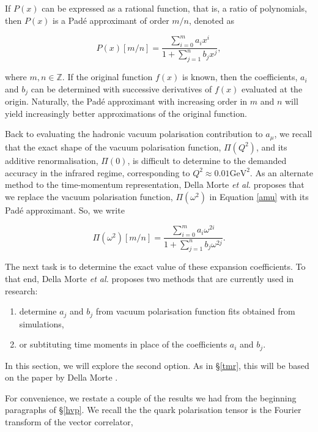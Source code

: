 \documentclass{article}
\numberwithin{equation}{section} %
\begin{document}
If $P(x)$ can be expressed as a rational function, that is, a ratio of polynomials, then $P(x)$ is a Pad\'{e} approximant of order $m/n$\cite{pade}, denoted as 

\begin{equation}
P(x)[m/n] = \frac{\sum_{i=0}^ma_ix^i}{1+\sum_{j=1}^nb_jx^j},
\label{pade}
\end{equation}

\noindent where $m,n\in \mathbb{Z}$. If the original function $f(x)$ is known, then the coefficients, $a_i$ and $b_j$ can be determined with successive derivatives of $f(x)$ evaluated at the origin. Naturally, the Pad\'{e} approximant with increasing order in $m$ and $n$ will yield increasingly better approximations of the original function.

Back to evaluating the hadronic vacuum polarisation contribution to $a_\mu$, we recall that the exact shape of the vacuum polarisation function, $\Pi(Q^2)$, and its additive renormalisation, $\Pi(0)$, is difficult to determine to the demanded accuracy in the infrared regime, corresponding to $Q^2 \approx 0.01\mathrm{GeV}^2$\cite{dellamorte}. As an alternate method to the time-momentum representation, Della Morte \textit{et al.}\cite{dellamorte} proposes that we replace the vacuum polarisation function, $\Pi(\omega^2)$ in Equation \ref{amu} with its Pad\'{e} approximant. So, we write

\begin{equation}
\Pi(\omega^2)[m/n] = \frac{\sum_{i=0}^ma_i\omega^{2i}}{1+\sum_{j=1}^nb_j\omega^{2j}}.
\end{equation}

The next task is to determine the exact value of these expansion coefficients. To that end, Della Morte \textit{et al.} proposes two methods that are currently used in research:

\begin{enumerate}
\item determine $a_j$ and $b_j$ from vacuum polarisation function fits obtained from simulations,
\item or subtituting time moments in place of the coefficients $a_i$ and $b_j$.
\end{enumerate}

In this section, we will explore the second option. As in \S \ref{tmr}, this will be based on the paper by Della Morte \cite{dellamorte}. 

For convenience, we restate a couple of the results we had from the beginning paragraphs of \S\ref{hvp}. We recall the the quark polarisation tensor is the Fourier transform of the vector correlator,
\end{document}
